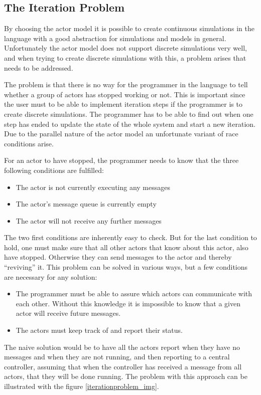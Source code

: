 \subsection{The Iteration Problem}
By choosing the actor model it is possible to create continuous simulations in the language with a good abstraction for simulations and models in general. Unfortunately the actor model does not support discrete simulations very well, and when trying to create discrete simulations with this, a problem arises that needs to be addressed.

The problem is that there is no way for the programmer in the language to tell whether a group of actors has stopped working or not. This is important since the user must to be able to implement iteration steps if the programmer is to create discrete simulations. The programmer has to be able to find out when one step has ended to update the state of the whole system and start a new iteration. Due to the parallel nature of the actor model an unfortunate variant of race conditions arise.

For an actor to have stopped, the programmer needs to know that the three following conditions are fulfilled:
\begin{itemize}
\item The actor is not currently executing any messages
\item The actor's message queue is currently empty
\item The actor will not receive any further messages
\end{itemize} 

The two first conditions are inherently easy to check. But for the last condition to hold, one must make sure that all other actors that know about this actor, also have stopped. Otherwise they can send messages to the actor and thereby \enquote{reviving} it. This problem can be solved in various ways, but a few conditions are necessary for any solution:

\begin{itemize}
\item The programmer must be able to assure which actors can communicate with each other. Without this knowledge it is impossible to know that a given actor will receive future messages.
\item The actors must keep track of and report their status.
\end{itemize} 

The naive solution would be to have all the actors report when they have no messages and when they are not running, and then reporting to a central controller, assuming that when the controller has received a message from all actors, that they will be done running. The problem with this approach can be illustrated with the figure \cref{iterationproblem_img}. 

